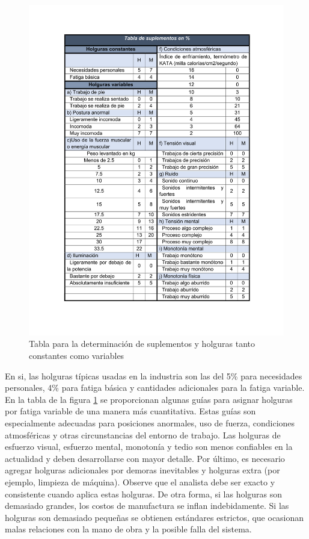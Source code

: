    \begin{figure}[H] 
        \centering
        \includegraphics[trim = {22mm 24mm 18mm 14mm},clip,scale=0.5]{22/Img/tablaDeSuplementos.pdf}
        \caption{Tabla para la determinación de suplementos y holguras tanto constantes como variables }
        \label{fig:holguras}
    \end{figure}
    
    En si, las holguras típicas usadas en la industria son las del 5\% para necesidades personales, 4\% para fatiga básica y cantidades adicionales para la fatiga variable. En la tabla de la figura \ref{fig:holguras} se proporcionan algunas guías para asignar holguras por fatiga variable de una manera más cuantitativa. Estas guías son especialmente adecuadas para posiciones anormales, uso de fuerza, condiciones atmosféricas y otras circunstancias del entorno de trabajo. Las holguras de esfuerzo visual, esfuerzo mental, monotonía y tedio son menos confiables en la actualidad y deben desarrollarse con mayor detalle. Por último, es necesario agregar holguras adicionales por demoras inevitables y holguras extra (por ejemplo, limpieza de máquina). Observe que el analista debe ser exacto y consistente cuando aplica estas holguras. De otra forma, si las holguras son demasiado grandes, los costos de manufactura se inflan indebidamente. Si las holguras son demasiado pequeñas se obtienen estándares estrictos, que ocasionan malas relaciones con la mano de obra y la posible falla del sistema.\cite{niebel1980ingenieria}
    
